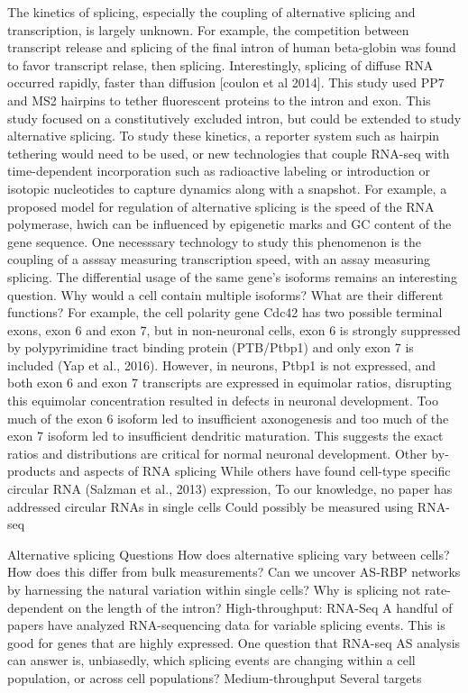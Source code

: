 The kinetics of splicing, especially the coupling of alternative splicing and transcription, is largely unknown. For example, the competition between transcript release and splicing of the final intron of human beta-globin was found to favor transcript relase, then splicing. Interestingly, splicing of diffuse RNA occurred rapidly, faster than diffusion [coulon et al 2014]. This study used PP7 and MS2 hairpins to tether fluorescent proteins to the intron and exon. This study focused on a constitutively excluded intron, but could be extended to study alternative splicing. To study these kinetics, a reporter system such as hairpin tethering would need to be used, or new technologies that couple RNA-seq with time-dependent incorporation such as radioactive labeling or introduction or isotopic nucleotides to capture dynamics along with a snapshot. For example, a proposed model for regulation of alternative splicing is the speed of the RNA polymerase, hwich can be influenced by epigenetic marks and GC content of the gene sequence. One necesssary technology to study this phenomenon is the coupling of a asssay measuring transcription speed, with an assay measuring splicing. 
The differential usage of the same gene’s isoforms remains an interesting question. Why would a cell contain multiple isoforms? What are their different functions? For example, the cell polarity gene Cdc42 has two possible terminal exons, exon 6 and exon 7, but in non-neuronal cells, exon 6 is strongly suppressed by polypyrimidine tract binding protein (PTB/Ptbp1) and only exon 7 is included (Yap et al., 2016). However, in neurons, Ptbp1 is not expressed, and both exon 6 and exon 7 transcripts are expressed in equimolar ratios, disrupting this equimolar concentration resulted in defects in neuronal development. Too much of the exon 6 isoform led to insufficient axonogenesis and too much of the exon 7 isoform led to insufficient dendritic maturation. This suggests the exact ratios and distributions are critical for normal neuronal development.
Other by-products and aspects of RNA splicing
While others have found cell-type specific circular RNA (Salzman et al., 2013) expression, To our knowledge, no paper has addressed circular RNAs in single cells
Could possibly be measured using RNA-seq

Alternative splicing
Questions
How does alternative splicing vary between cells? 
How does this differ from bulk measurements? 
Can we uncover AS-RBP networks by harnessing the natural variation within single cells?
Why is splicing not rate-dependent on the length of the intron?
High-throughput: RNA-Seq
A handful of papers have analyzed RNA-sequencing data for variable splicing events.
This is good for genes that are highly expressed.
One question that RNA-seq AS analysis can answer is, unbiasedly, which splicing events are changing within a cell population, or across cell populations?
Medium-throughput
Several targets 

